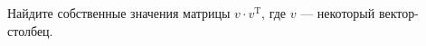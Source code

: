 \documentclass{article}
\begin{document}
Найдите собственные значения матрицы $v \cdot v^{\mathrm{T}}$, где $v$ --- некоторый вектор-столбец.
\end{document}

